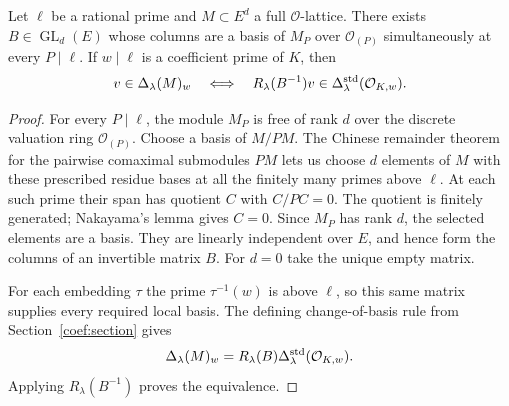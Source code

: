 \begin{lemma}\label{atl-semilocal-basis}
Let $\ell$ be a rational prime and $M\subset E^d$ a full
$\mathcal O$-lattice.  There exists
$B\in\operatorname{GL}_d(E)$ whose columns are a basis of
$M_P$ over $\mathcal O_{(P)}$ simultaneously at every
$P\mid\ell$.  If $w\mid\ell$ is a coefficient prime of $K$,
then
\begin{equation}\label{atl-local-coefficient}
 v\in\Delta_\lambda(M)_w
 \quad\Longleftrightarrow\quad
 R_\lambda(B^{-1})v\in
                 \Delta_\lambda^{\rm std}(\mathcal O_{K,w}).
\end{equation}
\end{lemma}
\begin{proof}
For every $P\mid\ell$, the module $M_P$ is free of rank
$d$ over the discrete valuation ring $\mathcal O_{(P)}$.
Choose a basis of $M/PM$.  The Chinese remainder theorem
for the pairwise comaximal submodules $PM$ lets us choose
$d$ elements of $M$ with these prescribed residue bases
at all the finitely many primes above $\ell$.
At each such prime their span has quotient $C$ with
$C/PC=0$.  The quotient is finitely generated; Nakayama's
lemma gives $C=0$.  Since $M_P$ has rank $d$, the selected
elements are a basis.  They are linearly independent over
$E$, and hence form the columns of an invertible matrix
$B$.  For $d=0$ take the unique empty matrix.

For each embedding $\tau$ the prime $\tau^{-1}(w)$ is
above $\ell$, so this same matrix supplies every required
local basis.  The defining change-of-basis rule from
Section~\ref{coef:section} gives
\[
 \Delta_\lambda(M)_w
     =R_\lambda(B)\Delta_\lambda^{\rm std}(\mathcal O_{K,w}).
\]
Applying $R_\lambda(B^{-1})$ proves the equivalence.
\end{proof}


